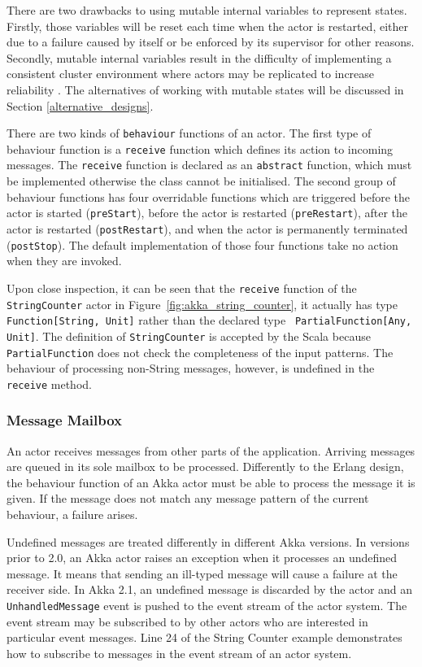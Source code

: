 There are two drawbacks to using mutable internal variables to represent 
states. Firstly, those variables will be reset each time when the actor is 
restarted, either due to a failure caused by itself or be enforced by its 
supervisor for other reasons.  Secondly, mutable internal variables result in 
the difficulty of implementing a consistent cluster environment where actors may 
be replicated to increase reliability \citep{Kuhn12}.  The alternatives of 
working with mutable states will be discussed in Section 
\ref{alternative_designs}.

There are two kinds of {\tt behaviour} functions of an actor.  The first type of 
behaviour function is a {\tt receive} function which defines its action to 
incoming messages.  The {\tt receive} function is declared as an {\tt abstract} 
function, which must be implemented otherwise the class cannot be initialised. 
The second group of behaviour functions has four overridable functions which 
are triggered before the actor is started ({\tt preStart}), before the actor is 
restarted ({\tt preRestart}), after the actor is restarted ({\tt postRestart}), 
and when the actor is permanently terminated ({\tt postStop}). The default 
implementation of those four functions take no action when they are 
invoked.

Upon close inspection, it can be seen that the {\tt receive} function of the 
{\tt StringCounter} actor in Figure~\ref{fig:akka_string_counter}, it actually 
has type {\tt Function[String, Unit]} rather than the declared type {\tt 
PartialFunction[Any, Unit]}.  The definition  of {\tt StringCounter} is 
accepted by the Scala because {\tt PartialFunction} does not check the 
completeness of the input patterns.  The behaviour of processing non-String 
messages, however, is undefined in the {\tt receive} method.

\subsubsection{Message Mailbox}
\label{message mailbox}

An actor receives messages from other parts of the application.  Arriving 
messages are queued in its sole mailbox to be processed.  Differently to the 
Erlang design, the behaviour function of 
an Akka actor must be able to process the message it is given.  If the message 
does not match any message pattern of the current behaviour, a failure arises.

Undefined messages are treated differently in different Akka versions.  In
versions prior to 2.0, an Akka actor raises an exception when it processes an 
undefined message. It means that sending an ill-typed message will cause a 
failure at the receiver side.  In Akka 2.1, an undefined message is discarded 
by the actor and an {\tt UnhandledMessage} event is pushed to the event stream 
of the actor system. The event stream may be subscribed to by other actors who 
are interested in particular event messages.  Line 24 of the String Counter
example demonstrates how to subscribe to messages in the event stream
of an actor system.





